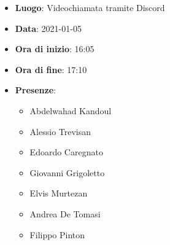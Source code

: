 \begin{itemize}
    \item \textbf{Luogo}: Videochiamata tramite Discord
    \item \textbf{Data}: 2021-01-05
    \item \textbf{Ora di inizio}: 16:05
    \item \textbf{Ora di fine}: 17:10
    \item \textbf{Presenze}:
          \begin{itemize}
            \item Abdelwahad Kandoul
            \item Alessio Trevisan
            \item Edoardo Caregnato
            \item Giovanni Grigoletto
            \item Elvis Murtezan
            \item Andrea De Tomasi
            \item Filippo Pinton
          \end{itemize}
\end{itemize}